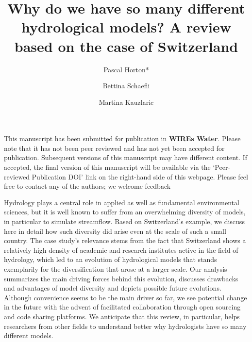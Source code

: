 \documentclass[10pt,a4paper]{article}
\def\preprint{}
\renewenvironment{abstract}
 {{\bfseries\noindent{\abstractname}\par\nobreak}\footnotesize}
 {\bigskip}
\begin{document}
\title{Why do we have so many different hydrological models? A review based on the case of Switzerland}


\author[1]{Pascal Horton*}
\author[1]{Bettina Schaefli}
\author[1]{Martina Kauzlaric}


 \date{}


\ifdefined\preprint
\setcounter{page}{0}
\hrulefill

This manuscript has been submitted for publication in \textbf{WIREs Water}. Please note that it has not been peer reviewed and has not yet been accepted for publication. Subsequent versions of this manuscript may have different content. If accepted, the final version of this manuscript will be available via the ‘Peer-reviewed Publication DOI’ link on the right-hand side of this webpage. Please feel free to contact any of the authors; we welcome feedback

\hrulefill
\newpage
\fi

\begingroup
\maketitle
\endgroup




\begin{abstract}
Hydrology plays a central role in applied as well as fundamental environmental sciences, but it is well known to suffer from an overwhelming diversity of models, in particular to simulate streamflow. Based on Switzerland's example, we discuss here in detail how such diversity did arise even at the scale of such a small country. The case study's relevance stems from the fact that Switzerland shows a relatively high density of academic and research institutes active in the field of hydrology, which led to an evolution of hydrological models that stands exemplarily for the diversification that arose at a larger scale. Our analysis summarizes the main driving forces behind this evolution, discusses drawbacks and advantages of model diversity and depicts possible future evolutions. Although convenience seems to be the main driver so far, we see potential change in the future with the advent of facilitated collaboration through open sourcing and code sharing platforms. We anticipate that this review, in particular, helps researchers from other fields to understand better why hydrologists have so many different models.
\end{abstract}%
\end{document}
